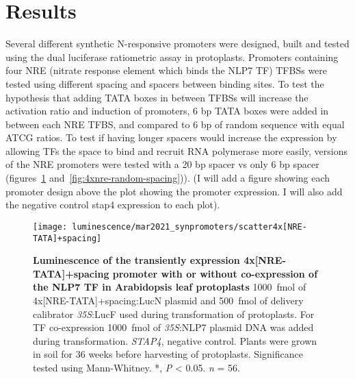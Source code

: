 \documentclass[../main.tex]{subfiles}
\begin{document}
\section{Results}\label{chapter5:results}

Several different synthetic N\hyp{}responsive promoters were designed, built and tested using the dual luciferase ratiometric assay in protoplasts.
Promoters containing four NRE (nitrate response element which binds the NLP7 TF) TFBSs were tested using different spacing and spacers between binding sites.
To test the hypothesis that adding TATA boxes in between TFBSs will increase the activation ratio and induction of promoters, 6 bp TATA boxes were added in between each NRE TFBS, and compared to 6 bp of random sequence with equal ATCG ratios.
To test if having longer spacers would  increase the expression by allowing TFs the space to bind and recruit RNA polymerase more easily, versions of the NRE promoters were tested with a 20 bp spacer vs only 6 bp spacer (figures~\ref{fig:4xnre-tata-spacing} and~\ref{fig:4xnre-random-spacing})).
(I will add a figure showing each promoter design above the plot showing the promoter expression. I will also add the negative control stap4 expression to each plot).
\begin{figure}[hbt!]
	\begin{center}
		\capstart
		\texttt{[image: luminescence/mar2021\_synpromoters/scatter4x[NRE-TATA]+spacing]}
		\caption{
			\textbf{Luminescence of the transiently expression 4x[NRE-TATA]+spacing promoter with or without co\hyp{}expression of the NLP7 TF in Arabidopsis leaf protoplasts}
			\SI{1000}{\fmol} of 4x[NRE-TATA]+spacing:LucN plasmid and \SI{500}{\fmol} of delivery calibrator \textit{35S}:LucF used during transformation of protoplasts.
			For TF co\hyp{}expression \SI{1000}{\fmol} of \textit{35S}:NLP7 plasmid DNA was added during transformation.
			\textit{STAP4}, negative control.
			Plants were grown in soil for 3\textendash{}6 weeks before harvesting of protoplasts.
			Significance tested using Mann-Whitney.
			*, \textit{P} \textless{} 0.05.
			\textit{n} = 5\textendash{}6.
			\label{fig:4xnre-tata-spacing}
		}
	\end{center}
\end{figure}
\end{document}
